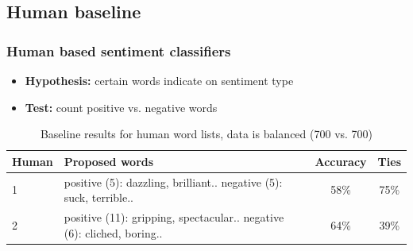 \documentclass{beamer}
\begin{document}

\subsection{Human baseline}
\begin{frame}
	\frametitle{Human based sentiment classifiers}
	\begin{itemize}
		
		
		\item \textbf{Hypothesis:} certain words indicate on sentiment type
		
		\item \textbf{Test:} count positive vs. negative words
	\end{itemize}
	
	\begin{table}
		\scriptsize
		\begin{tabular}{ l | p{5cm} | c | c }
			Human & Proposed words & Accuracy & Ties \footnotemark \\ \hline \hline
			1 & positive (5): dazzling, brilliant.. \newline negative (5): suck, terrible.. & 58\% & 75\% \\ \hline
			2 & positive (11): gripping, spectacular.. \newline negative (6): cliched, boring.. & 64\% & 39\%  \\  \hline
		\end{tabular}
		\caption{Baseline results for human word lists, data is balanced (700 vs. 700)}
	\end{table}
	
	 \footnotetext{Documents percentage where sentiments rated equally}
\end{frame}
\end{document}
